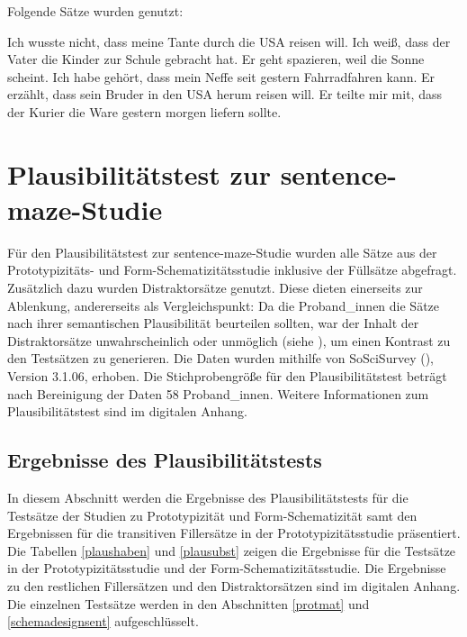 Folgende Sätze wurden genutzt:

\ea Ich wusste nicht, dass meine Tante durch die USA reisen will.  		
\ex Ich weiß, dass der Vater die Kinder zur Schule gebracht hat. 		
\ex Er geht spazieren, weil die Sonne scheint.	
\ex Ich habe gehört, dass mein Neffe seit gestern Fahrradfahren kann.		
\ex Er erzählt, dass sein Bruder in den USA herum reisen will. 		
\ex Er teilte mir mit, dass der Kurier die Ware gestern morgen liefern sollte.
\z

\chapter{Plausibilitätstest zur sentence-maze-Studie}
\label{plausent}

Für den Plausibilitätstest zur sentence-maze-Studie wurden alle Sätze aus der Prototypizitäts- und Form-Schematizitätsstudie inklusive der Füllsätze abgefragt. Zusätzlich dazu wurden Distraktorsätze genutzt. Diese dieten einerseits zur Ablenkung, andererseits als Vergleichspunkt: Da die Proband\_innen die Sätze nach ihrer semantischen Plausibilität beurteilen sollten, war der Inhalt der Distraktorsätze unwahrscheinlich oder unmöglich (siehe ), um einen Kontrast zu den Testsätzen zu generieren.
Die Daten wurden mithilfe von SoSciSurvey (\cite{Leiner.2019}), Version 3.1.06, erhoben. Die Stichprobengröße für den Plausibilitätstest beträgt nach Bereinigung der Daten 58 Proband\_innen. Weitere Informationen zum Plausibilitätstest sind im digitalen Anhang.

\section{Ergebnisse des Plausibilitätstests}
In diesem Abschnitt werden die Ergebnisse des Plausibilitätstests für die Testsätze der Studien zu Prototypizität und Form-Schematizität samt den Ergebnissen für die transitiven Fillersätze in der Prototypizitätsstudie präsentiert. Die Tabellen \ref{plaushaben} und \ref{plausubst} zeigen die Ergebnisse für die Testsätze in der Prototypizitätsstudie und der Form-Schematizitätsstudie. Die Ergebnisse zu den restlichen Fillersätzen und den Distraktorsätzen sind im digitalen Anhang.  Die einzelnen Testsätze werden in den Abschnitten \ref{protmat} und \ref{schemadesignsent} aufgeschlüsselt. 

